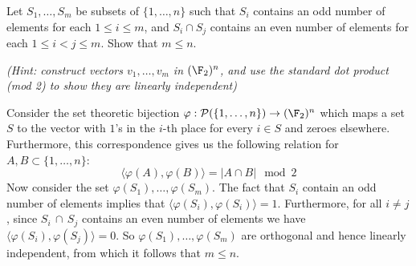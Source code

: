 \begin{problem}
Let $S_1,\dots,S_m$ be subsets of $\{1,\dots,n\}$ such that $S_i$ contains an odd number of elements for each $1\leq i\leq m$, and $S_i\cap S_j$ contains an even number of elements for each $1\leq i<j\leq m$. Show that $m\leq n$. 
\end{problem}
\textit{(Hint: construct vectors $v_1,\dots,v_m$ in $(\F_2)^n$, and use the
standard dot product (mod 2) to show they are linearly independent)}

Consider the set theoretic bijection $\varphi : \mathcal{P}(\{1,\dots,n\}) \to (\F_2)^n$ which maps a set $S$ to the vector with $1$'s in the $i$-th place for every $i\in S$ and zeroes elsewhere. Furthermore, this correspondence gives us the following relation for $A,B\subset \{1,\dots,n\}$:
\[
  \big\langle \varphi(A), \varphi(B)\big\rangle = |A\cap B|\mod 2
\] 
Now consider the set $\varphi(S_1),\dots,\varphi(S_m)$. The fact that $S_i$ contain an odd number of elements implies that $\big\langle\varphi(S_i), \varphi(S_i)\big\rangle=1$. Furthermore, for all $i\neq j$, since $S_i\,\cap\,S_j$ contains an even number of elements we have $\big\langle \varphi(S_i), \varphi(S_j)\big\rangle=0$. So $\varphi(S_1),\dots,\varphi(S_m)$ are orthogonal and hence linearly independent, from which it follows that $m\leq n$. 

